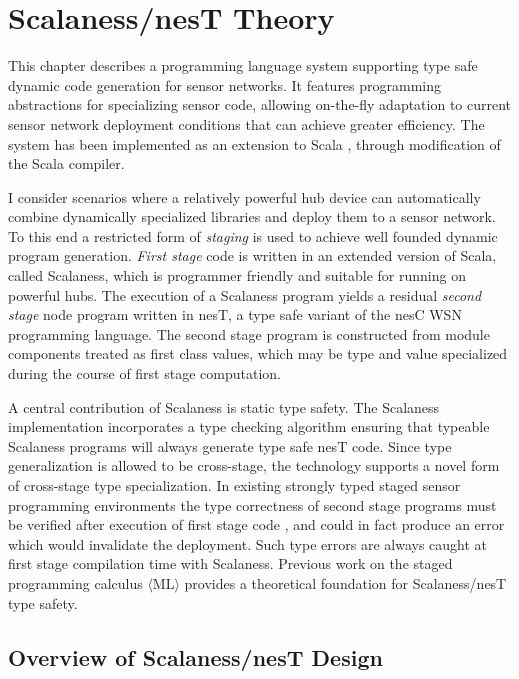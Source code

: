 
\chapter{Scalaness/nesT Theory}
\label{chapter-scalaness-nest-theory}


This chapter describes a programming language system supporting type safe dynamic code
generation for sensor networks. It features programming abstractions for specializing sensor
code, allowing on-the-fly adaptation to current sensor network deployment conditions that can
achieve greater efficiency. The system has been implemented as an extension to Scala
\cite{PiS2}, through modification of the Scala compiler.

I consider scenarios where a relatively powerful hub device can automatically combine
dynamically specialized libraries and deploy them to a sensor network. To this end a restricted
form of \emph{staging} \cite{Taha-MetaML,DBLP:conf/icess/Taha04,289140} is used to achieve well
founded dynamic program generation. \emph{First stage} code is written in an extended version of
Scala, called Scalaness, which is programmer friendly and suitable for running on powerful hubs.
The execution of a Scalaness program yields a residual \emph{second stage} node program written
in nesT, a type safe variant of the nesC WSN programming language. The second stage program is
constructed from module components treated as first class values, which may be type and value
specialized during the course of first stage computation.

A central contribution of Scalaness is static type safety. The Scalaness implementation
incorporates a type checking algorithm ensuring that typeable Scalaness programs will always
generate type safe nesT code. Since type generalization is allowed to be cross-stage, the
technology supports a novel form of cross-stage type specialization. In existing strongly typed
staged sensor programming environments the type correctness of second stage programs must be
verified after execution of first stage code \cite{Mainland-Flask-2008}, and could in fact
produce an error which would invalidate the deployment. Such type errors are always caught at
first stage compilation time with Scalaness. Previous work on the staged programming calculus
$\langle \text{ML} \rangle$ \cite{FramedML} provides a theoretical foundation for Scalaness/nesT
type safety.

\section{Overview of Scalaness/nesT Design}


